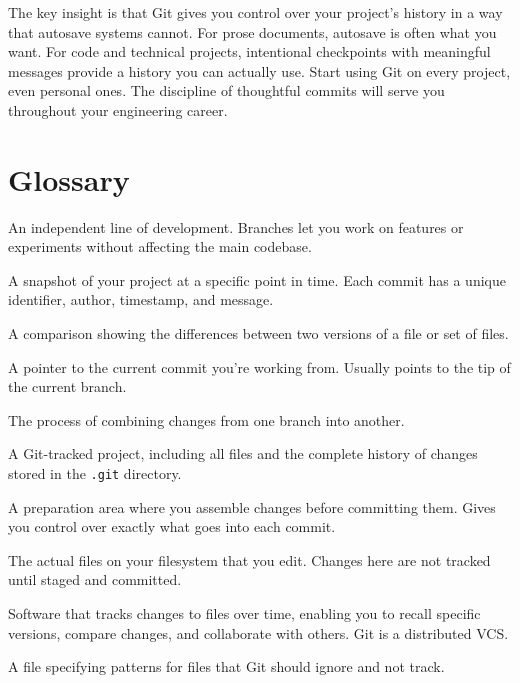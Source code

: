 \documentclass[
  letterpaper,
  DIV=11,
  numbers=noendperiod]{scrreprt}
\providecommand{\tightlist}{%
  \setlength{\itemsep}{0pt}\setlength{\parskip}{0pt}}
\begin{document}
The key insight is that Git gives you control over your project's
history in a way that autosave systems cannot. For prose documents,
autosave is often what you want. For code and technical projects,
intentional checkpoints with meaningful messages provide a history you
can actually use. Start using Git on every project, even personal ones.
The discipline of thoughtful commits will serve you throughout your
engineering career.

\section{Glossary}\label{glossary-3}

\begin{description}
\tightlist
\item[\textbf{Branch}]
An independent line of development. Branches let you work on features or
experiments without affecting the main codebase.
\item[\textbf{Commit}]
A snapshot of your project at a specific point in time. Each commit has
a unique identifier, author, timestamp, and message.
\item[\textbf{Diff}]
A comparison showing the differences between two versions of a file or
set of files.
\item[\textbf{HEAD}]
A pointer to the current commit you're working from. Usually points to
the tip of the current branch.
\item[\textbf{Merge}]
The process of combining changes from one branch into another.
\item[\textbf{Repository (Repo)}]
A Git-tracked project, including all files and the complete history of
changes stored in the \texttt{.git} directory.
\item[\textbf{Staging Area (Index)}]
A preparation area where you assemble changes before committing them.
Gives you control over exactly what goes into each commit.
\item[\textbf{Working Directory}]
The actual files on your filesystem that you edit. Changes here are not
tracked until staged and committed.
\item[\textbf{Version Control System (VCS)}]
Software that tracks changes to files over time, enabling you to recall
specific versions, compare changes, and collaborate with others. Git is
a distributed VCS.
\item[\textbf{.gitignore}]
A file specifying patterns for files that Git should ignore and not
track.
\end{description}
\end{document}
